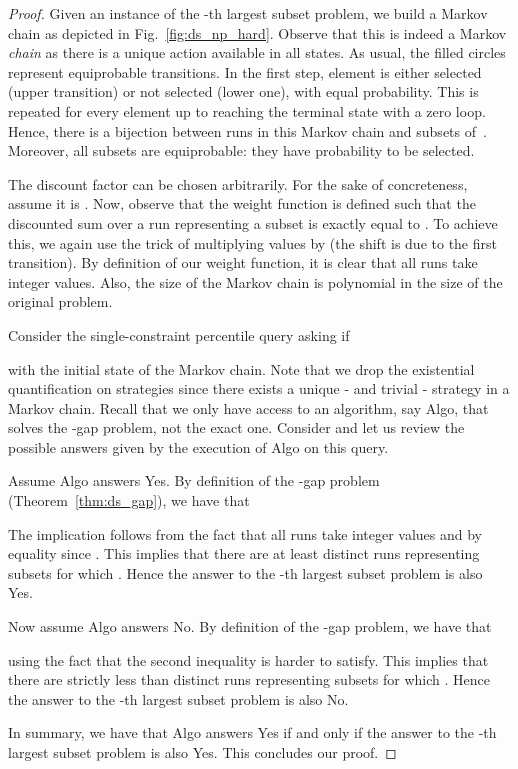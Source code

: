 \documentclass{llncs}
\begin{document}
\begin{proof}
Given an instance of the -th largest subset problem, we build a Markov chain as depicted in Fig.~\ref{fig:ds_np_hard}. Observe that this is indeed a Markov \textit{chain} as there is a unique action available in all states. As usual, the filled circles represent equiprobable transitions. In the first step, element  is either selected (upper transition) or not selected (lower one), with equal probability. This is repeated for every element up to reaching the terminal state with a zero loop. Hence, there is a bijection between runs in this Markov chain and subsets of~. Moreover, all subsets are equiprobable: they have probability  to be selected.

The discount factor can be chosen arbitrarily. For the sake of concreteness, assume it is . Now, observe that the weight function is defined such that the discounted sum over a run representing a subset  is exactly equal to . To achieve this, we again use the trick of multiplying values  by  (the shift is due to the first transition). By definition of our weight function, it is clear that all runs take integer values. Also, the size of the Markov chain is polynomial in the size of the original problem.

Consider the single-constraint percentile query asking if

with  the initial state of the Markov chain. Note that we drop the existential quantification on strategies since there exists a unique - and trivial - strategy in a Markov chain. Recall that we only have access to an algorithm, say \textsf{Algo}, that solves the -gap problem, not the exact one. Consider  and let us review the possible answers given by the execution of \textsf{Algo} on this query.

Assume \textsf{Algo} answers \textsf{Yes}. By definition of the -gap problem (Theorem~\ref{thm:ds_gap}), we have that

The implication follows from the fact that all runs take integer values and by equality  since . This implies that there are at least  distinct runs representing subsets  for which . Hence the answer to the -th largest subset problem is also \textsf{Yes}.

Now assume \textsf{Algo} answers \textsf{No}. By definition of the -gap problem, we have that

using the fact that the second inequality is harder to satisfy. This implies that there are strictly less than  distinct runs representing subsets  for which . Hence the answer to the -th largest subset problem is also \textsf{No}.

In summary, we have that \textsf{Algo} answers \textsf{Yes} if and only if the answer to the -th largest subset problem is also \textsf{Yes}. This concludes our proof.
\end{proof}
\end{document}
